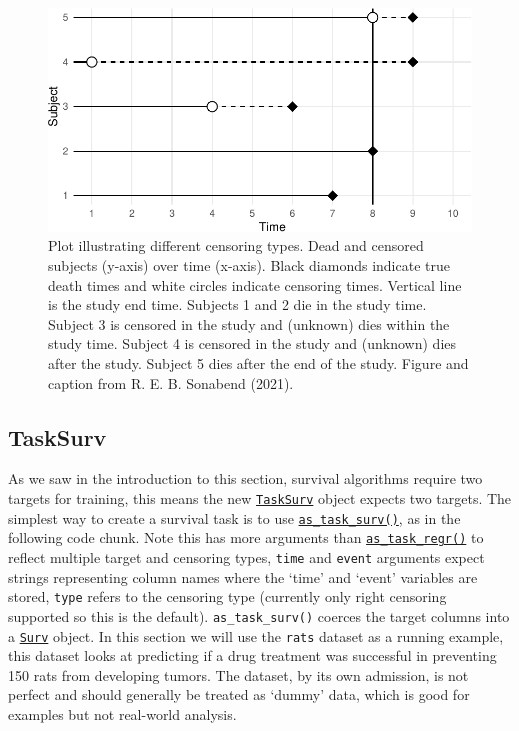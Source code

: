 \begin{figure}

{\centering \includegraphics[width=1\textwidth,height=\textheight]{chapters/chapter13/beyond_regression_and_classification_files/figure-pdf/fig-censoring-1.pdf}

}

\caption{\label{fig-censoring}Plot illustrating different censoring
types. Dead and censored subjects (y-axis) over time (x-axis). Black
diamonds indicate true death times and white circles indicate censoring
times. Vertical line is the study end time. Subjects 1 and 2 die in the
study time. Subject 3 is censored in the study and (unknown) dies within
the study time. Subject 4 is censored in the study and (unknown) dies
after the study. Subject 5 dies after the end of the study. Figure and
caption from R. E. B. Sonabend (2021).}

\end{figure}

\hypertarget{tasksurv}{%
\subsection{TaskSurv}\label{tasksurv}}

As we saw in the introduction to this section, survival algorithms
require two targets for training, this means the new
\href{https://mlr3proba.mlr-org.com/reference/TaskSurv.html}{\texttt{TaskSurv}}
object expects two targets. The simplest way to create a survival task
is to use
\href{https://mlr3proba.mlr-org.com/reference/as_task_surv.html}{\texttt{as\_task\_surv()}},
as in the following code chunk. Note this has more arguments than
\href{https://mlr3.mlr-org.com/reference/as_task_regr.html}{\texttt{as\_task\_regr()}}
to reflect multiple target and censoring types, \texttt{time} and
\texttt{event} arguments expect strings representing column names where
the `time' and `event' variables are stored, \texttt{type} refers to the
censoring type (currently only right censoring supported so this is the
default). \texttt{as\_task\_surv()} coerces the target columns into a
\href{https://www.rdocumentation.org/packages/survival/topics/Surv}{\texttt{Surv}}
object. In this section we will use the \texttt{rats} dataset as a
running example, this dataset looks at predicting if a drug treatment
was successful in preventing 150 rats from developing tumors. The
dataset, by its own admission, is not perfect and should generally be
treated as `dummy' data, which is good for examples but not real-world
analysis.

